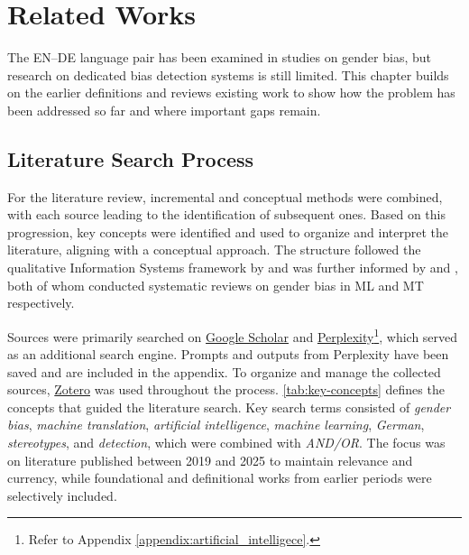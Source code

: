 \chapter{Related Works}
The EN–DE language pair has been examined in studies on gender bias, but research on dedicated bias detection systems is still limited. This chapter builds on the earlier definitions and reviews existing work to show how the problem has been addressed so far and where important gaps remain.

    \section{Literature Search Process}
        For the literature review, incremental and conceptual methods were combined, with each source leading to the identification of subsequent ones. Based on this progression, key concepts were identified and used to organize and interpret the literature, aligning with a conceptual approach. The structure followed the qualitative Information Systems framework by \textcite{schryenWritingQualitativeLiterature2015} and was further informed by \textcite{shresthaExploringGenderBiases2022} and \textcite{savoldiDecadeGenderBias2025}, both of whom conducted systematic reviews on gender bias in ML and MT respectively.

        Sources were primarily searched on \href{https://scholar.google.com/}{Google Scholar} and \href{https://www.perplexity.ai/}{Perplexity}\footnote{Refer to Appendix \ref{appendix:artificial_intelligece}.}, which served as an additional search engine. Prompts and outputs from Perplexity have been saved and are included in the appendix. To organize and manage the collected sources, \href{https://www.zotero.org/}{Zotero} was used throughout the process. \autoref{tab:key-concepts} defines the concepts that guided the literature search. Key search terms consisted of \textit{gender bias}, \textit{machine translation}, \textit{artificial intelligence}, \textit{machine learning}, \textit{German}, \textit{stereotypes}, and \textit{detection}, which were combined with \textit{AND/OR}. The focus was on literature published between 2019 and 2025 to maintain relevance and currency, while foundational and definitional works from earlier periods were selectively included.

